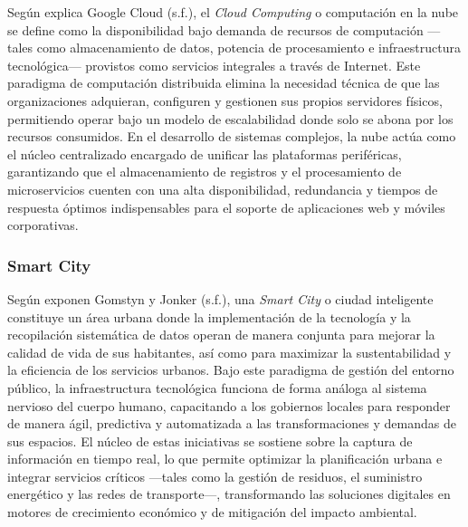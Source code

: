 \documentclass[12pt,a4paper]{article}
\begin{document}
Según explica Google Cloud (s.f.), el \textit{Cloud Computing} o computación en la nube se define como la disponibilidad bajo demanda de recursos de computación —tales como almacenamiento de datos, potencia de procesamiento e infraestructura tecnológica— provistos como servicios integrales a través de Internet. Este paradigma de computación distribuida elimina la necesidad técnica de que las organizaciones adquieran, configuren y gestionen sus propios servidores físicos, permitiendo operar bajo un modelo de escalabilidad donde solo se abona por los recursos consumidos. En el desarrollo de sistemas complejos, la nube actúa como el núcleo centralizado encargado de unificar las plataformas periféricas, garantizando que el almacenamiento de registros y el procesamiento de microservicios cuenten con una alta disponibilidad, redundancia y tiempos de respuesta óptimos indispensables para el soporte de aplicaciones web y móviles corporativas.

\subsubsection{Smart City}

Según exponen Gomstyn y Jonker (s.f.), una \textit{Smart City} o ciudad inteligente constituye un área urbana donde la implementación de la tecnología y la recopilación sistemática de datos operan de manera conjunta para mejorar la calidad de vida de sus habitantes, así como para maximizar la sustentabilidad y la eficiencia de los servicios urbanos. Bajo este paradigma de gestión del entorno público, la infraestructura tecnológica funciona de forma análoga al sistema nervioso del cuerpo humano, capacitando a los gobiernos locales para responder de manera ágil, predictiva y automatizada a las transformaciones y demandas de sus espacios. El núcleo de estas iniciativas se sostiene sobre la captura de información en tiempo real, lo que permite optimizar la planificación urbana e integrar servicios críticos —tales como la gestión de residuos, el suministro energético y las redes de transporte—, transformando las soluciones digitales en motores de crecimiento económico y de mitigación del impacto ambiental.
\end{document}
